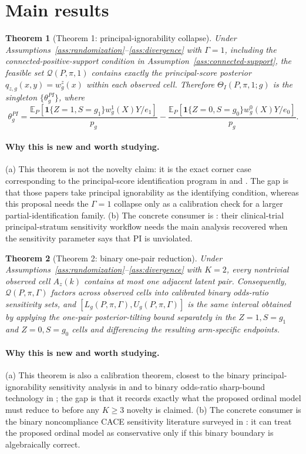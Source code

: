 \documentclass[11pt]{article}
\newcommand{\E}{\mathbb{E}}
\newcommand{\one}{\mathbf{1}}
\theoremstyle{definition}
\theoremstyle{plain}
\newtheorem{theorem}{Theorem}
\theoremstyle{remark}
\begin{document}
\section{Main results}
\begin{theorem}[Theorem 1: principal-ignorability collapse]\label{thm:pi-collapse}
Under Assumptions~\ref{ass:randomization}--\ref{ass:divergence} with \(\Gamma=1\), including the connected-positive-support condition in Assumption~\ref{ass:connected-support}, the feasible set \(\mathcal Q(P,\pi,1)\) contains exactly the principal-score posterior \(q_{z,g}(x,y)=w^z_g(x)\) within each observed cell.  Therefore \(\Theta_I(P,\pi,1;g)\) is the singleton \(\{\theta_g^{PI}\}\), where
\[
  \theta_g^{PI}
  =
  \frac{\E_P[\one\{Z=1,S=g_1\}w^1_g(X)Y/e_1]}{p_g}
  -
  \frac{\E_P[\one\{Z=0,S=g_0\}w^0_g(X)Y/e_0]}{p_g}.
\]
\end{theorem}

\paragraph{Why this is new and worth studying.}
(a) This theorem is not the novelty claim: it is the exact corner case corresponding to the principal-score identification program in \citet{DingLu2017} and \citet{JiangYangDing2022}.  The gap is that those papers take principal ignorability as the identifying condition, whereas this proposal needs the \(\Gamma=1\) collapse only as a calibration check for a larger partial-identification family.  (b) The concrete consumer is \citet{WangZhangMealliBornkamp2023}: their clinical-trial principal-stratum sensitivity workflow needs the main analysis recovered when the sensitivity parameter says that PI is unviolated.

\begin{theorem}[Theorem 2: binary one-pair reduction]\label{thm:binary-reduction}
Under Assumptions~\ref{ass:randomization}--\ref{ass:divergence} with \(K=2\), every nontrivial observed cell \(A_z(k)\) contains at most one adjacent latent pair.  Consequently, \(\mathcal Q(P,\pi,\Gamma)\) factors across observed cells into calibrated binary odds-ratio sensitivity sets, and \([L_g(P,\pi,\Gamma),U_g(P,\pi,\Gamma)]\) is the same interval obtained by applying the one-pair posterior-tilting bound separately in the \(Z=1,S=g_1\) and \(Z=0,S=g_0\) cells and differencing the resulting arm-specific endpoints.
\end{theorem}

\paragraph{Why this is new and worth studying.}
(a) This theorem is also a calibration theorem, closest to the binary principal-ignorability sensitivity analysis in \citet{NguyenStuartScharfsteinOgburn2024} and to binary odds-ratio sharp-bound technology in \citet{DornGuoKallus2022}; the gap is that it records exactly what the proposed ordinal model must reduce to before any \(K\ge3\) novelty is claimed.  (b) The concrete consumer is the binary noncompliance CACE sensitivity literature surveyed in \citet{DingLu2017}: it can treat the proposed ordinal model as conservative only if this binary boundary is algebraically correct.
\end{document}
